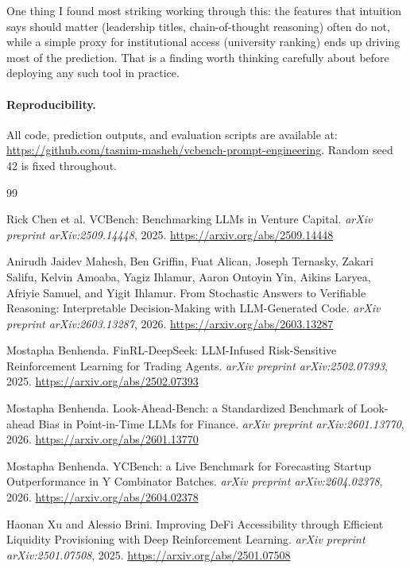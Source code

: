 \documentclass{article}
\begin{document}
One thing I found most striking working through this: the features that intuition says should matter (leadership titles, chain-of-thought reasoning) often do not, while a simple proxy for institutional access (university ranking) ends up driving most of the prediction. That is a finding worth thinking carefully about before deploying any such tool in practice.

\paragraph{Reproducibility.} All code, prediction outputs, and evaluation scripts are available at: \url{https://github.com/tasnim-masheh/vcbench-prompt-engineering}. Random seed 42 is fixed throughout.

\clearpage

\begin{thebibliography}{99}

Rick Chen et al.
\newblock VCBench: Benchmarking LLMs in Venture Capital.
\newblock \textit{arXiv preprint arXiv:2509.14448}, 2025.
\newblock \url{https://arxiv.org/abs/2509.14448}

Anirudh Jaidev Mahesh, Ben Griffin, Fuat Alican, Joseph Ternasky, Zakari Salifu, Kelvin Amoaba, Yagiz Ihlamur, Aaron Ontoyin Yin, Aikins Laryea, Afriyie Samuel, and Yigit Ihlamur.
\newblock From Stochastic Answers to Verifiable Reasoning: Interpretable Decision-Making with LLM-Generated Code.
\newblock \textit{arXiv preprint arXiv:2603.13287}, 2026.
\newblock \url{https://arxiv.org/abs/2603.13287}

Mostapha Benhenda.
\newblock FinRL-DeepSeek: LLM-Infused Risk-Sensitive Reinforcement Learning for Trading Agents.
\newblock \textit{arXiv preprint arXiv:2502.07393}, 2025.
\newblock \url{https://arxiv.org/abs/2502.07393}

Mostapha Benhenda.
\newblock Look-Ahead-Bench: a Standardized Benchmark of Look-ahead Bias in Point-in-Time LLMs for Finance.
\newblock \textit{arXiv preprint arXiv:2601.13770}, 2026.
\newblock \url{https://arxiv.org/abs/2601.13770}

Mostapha Benhenda.
\newblock YCBench: a Live Benchmark for Forecasting Startup Outperformance in Y Combinator Batches.
\newblock \textit{arXiv preprint arXiv:2604.02378}, 2026.
\newblock \url{https://arxiv.org/abs/2604.02378}

Haonan Xu and Alessio Brini.
\newblock Improving DeFi Accessibility through Efficient Liquidity Provisioning with Deep Reinforcement Learning.
\newblock \textit{arXiv preprint arXiv:2501.07508}, 2025.
\newblock \url{https://arxiv.org/abs/2501.07508}


\end{thebibliography}
\end{document}
